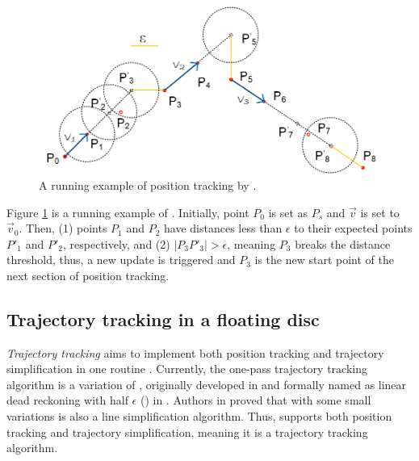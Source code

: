 \begin{figure}[tb!]
	\centering
	\includegraphics[scale=0.9]{figures/Fig-LDR.png}
	\vspace{-1ex}
	\caption{\small A running example of position tracking by \ldr. }
	\vspace{-2ex}
	\label{fig:ldr}
\end{figure}

\begin{example}
	\label{exm-ldr}
Figure \ref{fig:ldr} is a running example of \ldr.
Initially, point $P_0$ is set as $P_s$ and $\vec{v}$ is set to $\vec{v}_0$. Then, (1) points $P_1$ and $P_2$ have \sed distances less than $\epsilon$ to their expected points $P'_1$ and $P'_2$, respectively, and (2) $|P_3P'_3| > \epsilon$, meaning $P_3$ breaks the distance threshold, thus, a new update is triggered and $P_3$ is the new start point of the next section of position tracking.
%
\end{example}


 




\subsection{Trajectory tracking in a floating disc}
\textit{Trajectory tracking} aims to implement both position tracking and trajectory simplification in one routine \cite{Lange:Tracking}. Currently, the one-pass trajectory tracking algorithm is a variation of \ldr, originally developed in \cite{Trajcevski:LDRH} and formally named as linear dead reckoning with half $\epsilon$ (\ldrh) in \cite{Lange:Tracking}.
%
Authors in \cite{Trajcevski:LDRH} proved that \ldr with some small variations is also a line simplification algorithm. Thus, \ldrh supports both position tracking and trajectory simplification, meaning it is a trajectory tracking algorithm.

